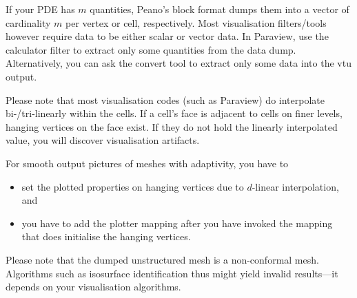 If your PDE has $m$ quantities, Peano's block format dumps them into a vector of
cardinality $m$ per vertex or cell, respectively. 
Most visualisation filters/tools however require data to be either scalar or 
vector data. 
In Paraview, use the calculator filter to extract only some quantities from the 
data dump.
Alternatively, you can ask the convert tool to extract only some data into the
vtu output.

\noindent
Please note that most visualisation codes (such as Paraview) do interpolate
bi-/tri-linearly within the cells. 
If a cell's face is adjacent to cells on finer levels, hanging vertices on the
face exist.
If they do not hold the linearly interpolated value, you will discover
visualisation artifacts.

\begin{remark}
  For smooth output pictures of meshes with adaptivity, you have to 
  \begin{itemize}
    \item set the plotted properties on hanging vertices due to $d$-linear
    interpolation, and
    \item you have to add the plotter mapping after you have invoked the mapping
    that does initialise the hanging vertices.
  \end{itemize}
\end{remark}


\noindent
Please note that the dumped unstructured mesh is a non-conformal mesh. 
Algorithms such as isosurface identification thus might yield invalid
results---it depends on your visualisation algorithms.
